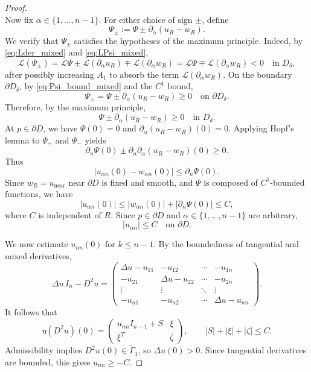 \documentclass[10pt,a4paper]{amsart}
\begin{document}
\begin{proof}
\begin{equation}
		\end{equation}
		Now fix $\alpha\in\{1,\dots,n-1\}$. For either choice of sign $\pm$, define
		\[
		\Psi_\pm := \Psi \pm \partial_\alpha(u_R-w_R).
		\]
		We verify that $\Psi_\pm$ satisfies the hypotheses of the maximum principle.
		Indeed, by \eqref{eq:Lder_mixed} and \eqref{eq:LPsi_mixed},
		\[
		\mathcal{L}(\Psi_\pm)
		= \mathcal{L}\Psi \pm \mathcal{L}(\partial_\alpha u_R) \mp \mathcal{L}(\partial_\alpha w_R)
		= \mathcal{L}\Psi \mp \mathcal{L}(\partial_\alpha w_R) < 0 \quad \text{in } D_\delta,
		\]
		after possibly increasing $A_1$ to absorb the term $\mathcal{L}(\partial_\alpha w_R)$.
		On the boundary $\partial D_\delta$, by \eqref{eq:Psi_bound_mixed} and the $C^1$ bound,
		\[
		\Psi_\pm = \Psi \pm \partial_\alpha(u_R-w_R) \ge 0 \quad \text{on } \partial D_\delta.
		\]
		Therefore, by the maximum principle,
		\begin{equation}
			\Psi \pm \partial_\alpha(u_R-w_R) \ge 0 \quad \text{in } D_\delta. \label{eq:Psi_alpha_bound_mixed}
		\end{equation}
		At $p\in\partial D$, we have $\Psi(0)=0$ and $\partial_\alpha(u_R-w_R)(0)=0$. 
		Applying Hopf's lemma to $\Psi_+$ and $\Psi_-$ yields
		\[
		\partial_n\Psi(0) \pm \partial_n\partial_\alpha(u_R-w_R)(0) \ge 0.
		\]
		Thus
		\[
		|u_{\alpha n}(0) - w_{\alpha n}(0)| \le \partial_n\Psi(0).
		\]
		Since $w_R=u_{\mathrm{near}}$ near $\partial D$ is fixed and smooth, and $\Psi$ is composed of $C^1$-bounded functions, we have
		\[
		|u_{\alpha n}(0)| \le |w_{\alpha n}(0)| + |\partial_n\Psi(0)| \le C,
		\]
		where $C$ is independent of $R$. Since $p\in\partial D$ and $\alpha\in\{1,\dots,n-1\}$ are arbitrary,
		\begin{equation}
			|u_{\alpha n}| \le C \quad \text{on } \partial D. \label{eq:mixed_mixed}
		\end{equation}
		
		
		
		
		We now estimate $u_{nn}(0)$ for $k\leq n-1$. By the boundedness of tangential and mixed derivatives,
		\[
		\Delta u \, I_n - D^2u = 
		\begin{pmatrix}
			\Delta u - u_{11} & -u_{12} & \cdots & -u_{1n} \\
			-u_{21} & \Delta u - u_{22} & \cdots & -u_{2n} \\
			\vdots & \vdots & \ddots & \vdots \\
			-u_{n1} & -u_{n2} & \cdots & \Delta u - u_{nn}
		\end{pmatrix}.
		\]
		It follows that 
		\[
		\eta(D^2 u)(0) = \begin{pmatrix}
			u_{nn} I_{n-1} + S & \xi \\
			\xi^T & \zeta
		\end{pmatrix},
		\qquad |S| + |\xi| + |\zeta| \le C.
		\]
		Admissibility implies $D^2 u(0) \in \widetilde{\Gamma}_1$, so $\Delta u(0) > 0$. Since tangential derivatives are bounded, this gives $u_{nn} \ge -C$.
		

\end{proof}
\end{document}
